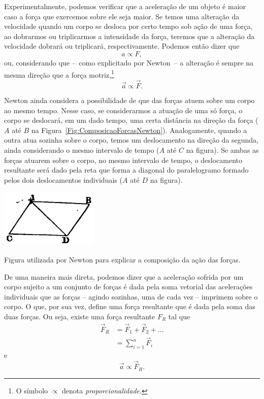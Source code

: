 Experimentalmente, podemos verificar que a aceleração de um objeto é maior caso a força que exercemos sobre ele seja maior. Se temos uma alteração da velocidade quando um corpo se desloca por certo tempo sob ação de uma força, ao dobrarmos ou triplicarmos a intensidade da força, teremos que a alteração da velocidade dobrará ou triplicará, respectivamente. Podemos então dizer que
\begin{equation}
  a \propto F,
\end{equation}
%
ou, considerando que --~como explicitado por Newton~-- a alteração é sempre na mesma direção que a força motriz,\footnote{O símbolo $\propto$ denota \emph{proporcionalidade}.}
\begin{equation}
    \vec{a} \propto \vec{F}.
\end{equation}

Newton ainda considera a possibilidade de que das forças atuem sobre um corpo ao mesmo tempo. Nesse caso, se considerarmos a atuação de uma só força, o corpo se deslocará, em um dado tempo, uma certa distância na direção da força ($A$ até $B$ na Figura~\ref{Fig:ComposicaoForcasNewton}). Analogamente, quando a outra atua sozinha sobre o corpo, temos um deslocamento na direção da segunda, ainda considerando o mesmo intervalo de tempo ($A$ até $C$ na figura). Se ambas as forças atuarem sobre o corpo, no mesmo intervalo de tempo, o deslocamento resultante será dado pela reta que forma a diagonal do paralelogramo formado pelos dois deslocamentos individuais ($A$ até $D$ na figura).

\begin{marginfigure}
\centering
\includegraphics[width= 0.7\linewidth]{Fig/177px-Principia1846-084.png}
\caption{Figura utilizada por Newton para explicar a composição da ação das forças.\label{Fig:ComposicaoForcasNewton}}
\end{marginfigure}

De uma maneira mais direta, podemos dizer que a aceleração sofrida por um corpo sujeito a um conjunto de forças é dada pela soma vetorial das acelerações individuais que as forças -- agindo sozinhas, uma de cada vez -- imprimem sobre o corpo. O que, por sua vez, define uma força resultante que é dada pela soma das duas forças. Ou seja, existe uma força resultante $F_R$ tal que
\begin{align}
    \vec{F}_R &= \vec{F}_1 + \vec{F}_2 + \dots \\
    &= \sum_{i = 1}^n \vec{F}_i
\end{align}
%
e
\begin{equation}
    \vec{a} \propto \vec{F}_R.
\end{equation}

